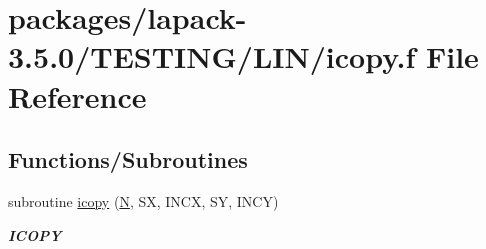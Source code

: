 \hypertarget{lapack-3_85_80_2TESTING_2LIN_2icopy_8f}{}\section{packages/lapack-\/3.5.0/\+T\+E\+S\+T\+I\+N\+G/\+L\+I\+N/icopy.f File Reference}
\label{lapack-3_85_80_2TESTING_2LIN_2icopy_8f}
\subsection*{Functions/\+Subroutines}
\begin{DoxyCompactItemize}
\item 
subroutine \hyperlink{group__aux__lin_ga977a7a5ad5efccf234a1ac5b23dd18cd}{icopy} (\hyperlink{polmisc_8c_a0240ac851181b84ac374872dc5434ee4}{N}, S\+X, I\+N\+C\+X, S\+Y, I\+N\+C\+Y)
\begin{DoxyCompactList}\small\item\em {\bfseries I\+C\+O\+P\+Y} \end{DoxyCompactList}\end{DoxyCompactItemize}
